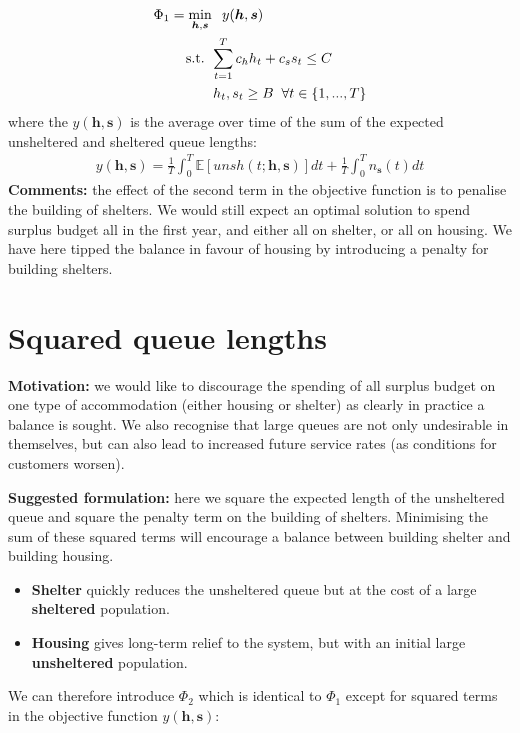 \documentclass{article}
\begin{document}
\begin{align*}
        & \Phi_1 = \min_{\boldsymbol{h},\boldsymbol{s}} \hspace{0.2cm} y(\boldsymbol{h},\boldsymbol{s}) \\
        & \hspace{0.7cm} \text{ s.t. } \sum_{t=1}^{T} c_{h}h_{t} + c_{s}s_{t} \leq C \\
        & \hspace{1.5cm} h_t, s_t \geq B \hspace{0.2cm} \forall t \in \{1, ..., T\}
\end{align*}
%
where the $y(\boldsymbol{h},\boldsymbol{s})$ is the average over time of the sum of the expected unsheltered and sheltered queue lengths: 
\begin{align*}
  y(\boldsymbol{h},\boldsymbol{s}) = \frac{1}{T} \int_0^T \mathbb{E}[unsh(t; \boldsymbol{h},\boldsymbol{s})] dt + \frac{1}{T} \int_0^T n_{\boldsymbol{s}}(t) dt
\end{align*}
%
\textbf{Comments:} the effect of the second term in the objective function is to penalise the building of shelters. We would still expect an optimal solution to spend surplus budget all in the first year, and either all on shelter, or all on housing. We have here tipped the balance in favour of housing by introducing a penalty for building shelters. 

\newpage

\section{Squared queue lengths}

\textbf{Motivation:} we would like to discourage the spending of all surplus budget on one type of accommodation (either housing or shelter) as clearly in practice a balance is sought. We also recognise that large queues are not only undesirable in themselves, but can also lead to increased future service rates (as conditions for customers worsen). \par
%
\textbf{Suggested formulation:} here we square the expected length of the unsheltered queue and square the penalty term on the building of shelters. Minimising the sum of these squared terms will encourage a balance between building shelter and building housing.
%
\begin{itemize}[noitemsep]
\item \textbf{Shelter} quickly reduces the unsheltered queue but at the cost of a large \textbf{sheltered} population.
\item \textbf{Housing} gives long-term relief to the system, but with an initial large \textbf{unsheltered} population. 
\end{itemize}
%
We can therefore introduce $\Phi_2$ which is identical to $\Phi_1$ except for squared terms in the objective function $y(\boldsymbol{h},\boldsymbol{s})$: 
\end{document}
